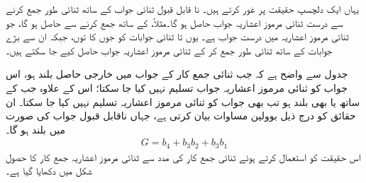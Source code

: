 یہاں ایک دلچسپ حقیقت پر غور کرتے ہیں۔ نا قابل قبول ثنائی جواب کے ساتھ   ثنائی طور جمع کرنے سے درست ثنائی مرموز  اعشاریہ جواب حاصل ہو گا۔مثلاً،  کے ساتھ   جمع کرنے سے  حاصل ہو گا،  جو ثنائی مرموز اعشاریہ میں درست جواب ہے۔ یوں  تا  ثنائی جوابات کو جوں کا توں، جبکہ   ان سے بڑے جوابات کے ساتھ  ثنائی طور جمع کر کے ثنائی مرموز اعشاریہ  جواب  حاصل کیے جا سکتے ہیں۔

	
جدول  سے واضح ہے کہ جب  ثنائی  جمع کار کے جواب میں خارجی حاصل    بلند ہو،  اس  جواب کو  ثنائی مرموز  اعشاریہ جواب تسلیم نہیں کیا جا سکتا؛ اس  کے علاوہ  جب   کے ساتھ   یا  بھی بلند ہو تب  بھی جواب کو ثنائی مرموز  اعشاریہ تسلیم نہیں کیا جا سکتا۔ ان حقائق کو درج ذیل بوولین مساوات بیان کرتی ہے، جہاں ناقابل قبول جواب کی صورت میں  بلند ہو گا۔
 \begin{align}
 G=b_4+b_3b_2+b_3b_1
 \end{align}
اس حقیقت کو استعمال کرتے ہوئے ثنائی جمع کار کی مدد سے  ثنائی مرموز  اعشاریہ جمع کار کا حصول شکل   میں  دکھایا گیا ہے۔
